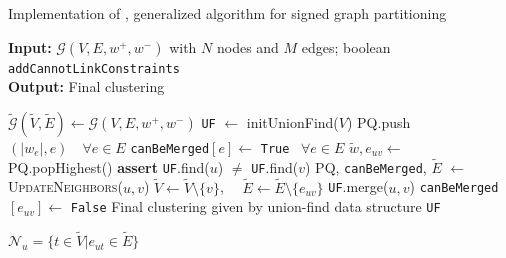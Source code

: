 

\begin{algorithm*}
  \caption{Implementation of \algname{}, generalized algorithm for signed graph partitioning}
\hspace*{\algorithmicindent} \textbf{Input:} $\mathcal{G}(V,E,w^+,w^-)$ with $N$ nodes and $M$ edges; boolean \texttt{{\color{blue}addCannotLinkConstraints}} \\
\hspace*{\algorithmicindent} \textbf{Output:} Final clustering \\
  \hspace*{\algorithmicindent} 
  \begin{algorithmic}[1]
      \State $\tilde{\mathcal{G}}(\tilde{V},\tilde{E}) \gets \mathcal{G}(V,E,w^+,w^-)$  
      \State \texttt{UF} $\gets$ initUnionFind($V$) 
        \State PQ.push$(|w_e|, e) \quad \forall e \in E $  
        \State \texttt{canBeMerged}$[e] \gets$ \texttt{True} $\,\,\, \forall e\in E$ 
    \State
        \State $\tilde{w}, e_{uv} \gets $ PQ.popHighest() 
        \State \textbf{assert} \texttt{UF}.find($u$) $\neq$ \texttt{UF}.find($v$) 
          \State PQ, \texttt{canBeMerged}, $\tilde{E}$ $\gets$ \textsc{UpdateNeighbors}($u,v$)
          \State $\tilde{V} \gets \tilde{V} \setminus \{ v\}$, $\quad \tilde{E} \gets \tilde{E} \setminus \{ e_{uv}\}$ 
          \State \texttt{UF}.merge($u,v$) 
          \State \texttt{canBeMerged}$[e_{uv}] \gets$ \texttt{False} 
        \EndIf
      \EndWhile
      \State
      \Return Final clustering given by union-find data structure  \texttt{UF}
  \end{algorithmic}
  \hspace*{1.5cm} 
    \begin{algorithmic}[1]
      \State $\mathcal{N}_u = \{ t \in \tilde{V} | e_{ut}\in \tilde{E}  \}$

\end{algorithmic}
\end{algorithm*}
